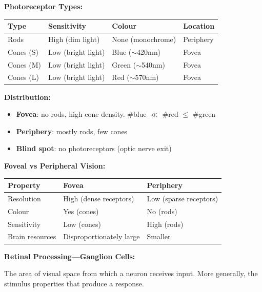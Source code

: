 \separator

\textbf{Photoreceptor Types:}

\begin{center}
\renewcommand{\arraystretch}{1.3}
\begin{tabular}{@{} l l l l @{}}
\toprule
\textbf{Type} & \textbf{Sensitivity} & \textbf{Colour} & \textbf{Location} \\
\midrule
Rods & High (dim light) & None (monochrome) & Periphery \\
Cones (S) & Low (bright light) & Blue ($\sim$420nm) & Fovea \\
Cones (M) & Low (bright light) & Green ($\sim$540nm) & Fovea \\
Cones (L) & Low (bright light) & Red ($\sim$570nm) & Fovea \\
\bottomrule
\end{tabular}
\end{center}

\textbf{Distribution:}
\begin{itemize}
  \item \textbf{Fovea}: no rods, high cone density. \#blue $\ll$ \#red $\leq$ \#green
  \item \textbf{Periphery}: mostly rods, few cones
  \item \textbf{Blind spot}: no photoreceptors (optic nerve exit)
\end{itemize}

\separator

\textbf{Foveal vs Peripheral Vision:}

\begin{center}
\renewcommand{\arraystretch}{1.3}
\begin{tabular}{@{} l l l @{}}
\toprule
\textbf{Property} & \textbf{Fovea} & \textbf{Periphery} \\
\midrule
Resolution & High (dense receptors) & Low (sparse receptors) \\
Colour & Yes (cones) & No (rods) \\
Sensitivity & Low (cones) & High (rods) \\
Brain resources & Disproportionately large & Smaller \\
\bottomrule
\end{tabular}
\end{center}

\separator

\textbf{Retinal Processing---Ganglion Cells:}

\begin{defbox}
The area of visual space from which a neuron receives input. More generally, the stimulus properties that produce a response.
\end{defbox}

